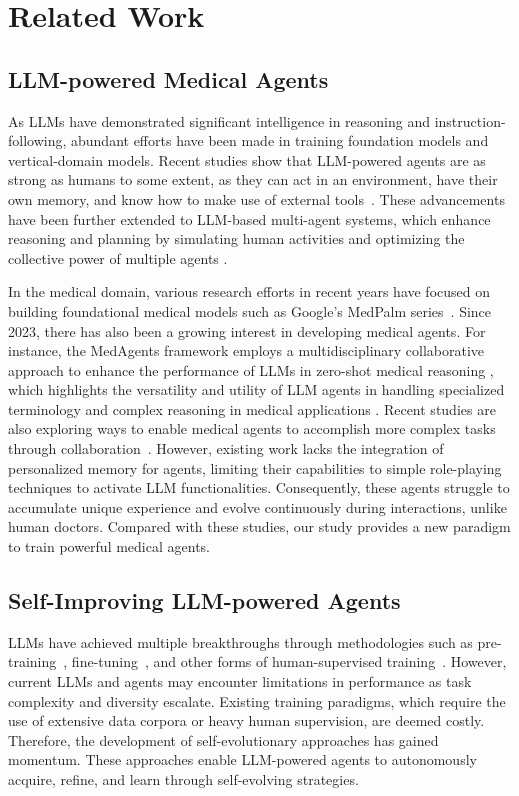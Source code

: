 \documentclass[fleqn,12pt]{wlscirep}
\begin{document}
\section*{Related Work}
\subsection*{LLM-powered Medical Agents}
As LLMs have demonstrated significant intelligence in reasoning and instruction-following, abundant efforts have been made in training foundation models and vertical-domain models. Recent studies show that LLM-powered agents are as strong as humans to some extent, as they can act in an environment, have their own memory, and know how to make use of external tools~\cite{huang2024understanding}. These advancements have been further extended to LLM-based multi-agent systems, which enhance reasoning and planning by simulating human activities and optimizing the collective power of multiple agents \cite{li2024survey}. 

In the medical domain, various research efforts in recent years have focused on building foundational medical models such as Google’s MedPalm series~\cite{Tu:24:MedPaLM_Med,  singhal2023towards}. Since 2023, there has also been a growing interest in developing medical agents. For instance, the MedAgents framework employs a multidisciplinary collaborative approach to enhance the performance of LLMs in zero-shot medical reasoning \cite{Tang:23:MedAgents}, which highlights the versatility and utility of LLM agents in handling specialized terminology and complex reasoning in medical applications \cite{qiu2024llm}. Recent studies are also exploring ways to enable medical agents to accomplish more complex tasks through collaboration~\cite{Kim:24:MDAgents, Li:24:Mmedagent}. However, existing work lacks the integration of personalized memory for agents, limiting their capabilities to simple role-playing techniques to activate LLM functionalities. Consequently, these agents struggle to accumulate unique experience and evolve continuously during interactions, unlike human doctors. Compared with these studies, our study provides a new paradigm to train powerful medical agents.

\subsection*{Self-Improving LLM-powered Agents}
LLMs have achieved multiple breakthroughs through methodologies such as pre-training~\cite{devlin-etal-2019-bert}, fine-tuning~\cite{raffel2020exploring}, and other forms of human-supervised training~\cite{ouyang2022training}. However, current LLMs and agents may encounter limitations in performance as task complexity and diversity escalate. Existing training paradigms, which require the use of extensive data corpora or heavy human supervision, are deemed costly. Therefore, the development of self-evolutionary approaches has gained momentum. These approaches enable LLM-powered agents to autonomously acquire, refine, and learn through self-evolving strategies.
\end{document}
